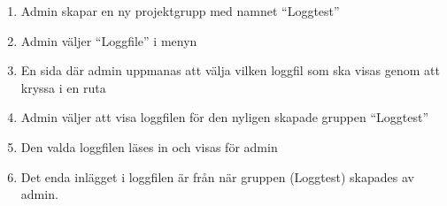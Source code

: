 \documentclass[paper=a4, fontsize=11pt,twoside]{article}
\begin{document}
		\begin{enumerate}
		  \item       Admin skapar en ny projektgrupp med namnet “Loggtest”
		  \item       Admin väljer “Loggfile” i menyn
		  \item       En sida där admin uppmanas att välja vilken loggfil som ska visas genom att kryssa i en ruta
		  \item       Admin väljer att visa loggfilen för den nyligen skapade gruppen “Loggtest”
		  \item       Den valda loggfilen läses in och visas för admin
		  \item       Det enda inlägget i loggfilen är från när
		  gruppen (Loggtest) skapades av admin.
		  
		\end{enumerate}
		
		
\end{document}
